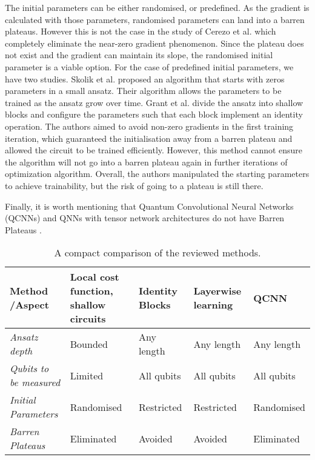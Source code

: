 The initial parameters can be either randomised, or predefined.
As the gradient is calculated with those parameters, randomised parameters can land into a barren plateaus.
However this is not the case in the study of Cerezo et al. which completely eliminate the near-zero gradient phenomenon.
Since the plateau does not exist and the gradient can maintain its slope, the randomised initial parameter is a viable option.
For the case of predefined initial parameters, we have two studies.
Skolik et al. \cite{skolikLayerwiseLearningQuantum2021} proposed an algorithm that starts with zeros parameters in a small ansatz. 
Their algorithm allows the parameters to be trained as the ansatz grow over time.
Grant et al. \cite{grantInitializationStrategyAddressing2019} divide the ansatz into shallow blocks and configure the parameters such that each block implement an identity operation.
The authors aimed to avoid non-zero gradients in the first training iteration, which guaranteed the initialisation away from a barren plateau and allowed the circuit to be trained efficiently.
However, this method cannot ensure the algorithm will not go into a barren plateau again in further iterations of optimization algorithm.
Overall, the authors manipulated the starting parameters to achieve trainability, but the risk of going to a plateau is still there.

Finally, it is worth mentioning that Quantum Convolutional Neural Networks (QCNNs) and QNNs with tensor network architectures do not have Barren Plateaus \cite{congQuantumConvolutionalNeural2019}.

\begin{table}[]
    \centering
    \begin{tabular}{|p{3cm}|p{2cm}|p{2cm}|p{2cm}|p{2cm}|}
        \hline
        \textbf{Method /\newline Aspect} & \textbf{Local cost function, shallow circuits} & \textbf{Identity Blocks} & \textbf{Layerwise learning}    & \textbf{QCNN} \\
        \hline
        \raggedright\emph{Ansatz depth} & Bounded                               & Any length        & Any length            & Any length \\
        \hline
        \raggedright\emph{Qubits to be measured}    & Limited                          & All qubits        & All qubits            & All qubits \\
        \hline
        \raggedright\emph{Initial Parameters}  & Randomised                            & Restricted        & Restricted            & Randomised \\
        \hline
        \raggedright\emph{Barren Plateaus}     & Eliminated                            & Avoided           & Avoided               & Eliminated \\
        \hline
    \end{tabular}
    \caption{A compact comparison of the reviewed methods.}
    \label{quick comparison of methods}
\end{table}
